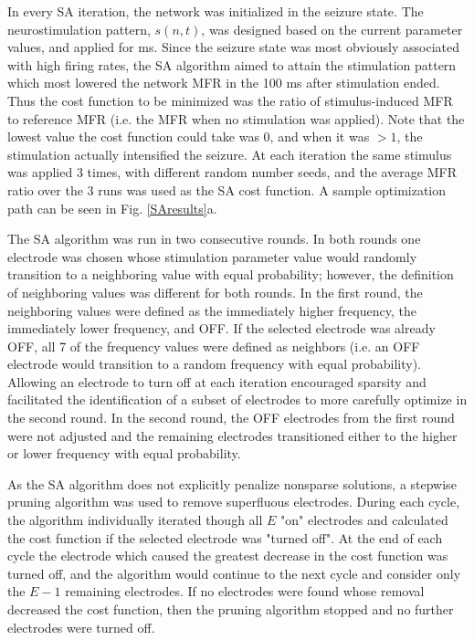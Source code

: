 \documentclass[11pt,a4paper,final]{article}
\begin{document}
In every SA iteration, the network was initialized in the seizure state.
The neurostimulation pattern, $s(n,t)$, was designed based on the current parameter values, and applied for \len ms.
Since the seizure state was most obviously associated with high firing rates, the SA algorithm aimed to attain the stimulation pattern which most lowered the network MFR in the 100 ms after stimulation ended.
Thus the cost function to be minimized was the ratio of stimulus-induced MFR to reference MFR (i.e. the MFR when no stimulation was applied).
Note that the lowest value the cost function could take was 0, and when it was $>1$, the stimulation actually intensified the seizure.
At each iteration the same stimulus was applied 3 times, with different random number seeds, and the average MFR ratio over the 3 runs was used as the SA cost function.
A sample optimization path can be seen in Fig. \ref{SAresults}a.

The SA algorithm was run in two consecutive rounds.
In both rounds one electrode was chosen whose stimulation parameter value would randomly transition to a neighboring value with equal probability; however, the definition of neighboring values was different for both rounds.
In the first round, the neighboring values were defined as the immediately higher frequency, the immediately lower frequency, and OFF.
If the selected electrode was already OFF, all 7 of the frequency values were defined as neighbors (i.e. an OFF electrode would transition to a random frequency with equal probability).
Allowing an electrode to turn off at each iteration encouraged sparsity and facilitated the identification of a subset of electrodes to more carefully optimize in the second round.
In the second round, the OFF electrodes from the first round were not adjusted and the remaining electrodes transitioned either to the higher or lower frequency with equal probability.

As the SA algorithm does not explicitly penalize nonsparse solutions, a stepwise pruning algorithm was used to remove superfluous electrodes.
During each cycle, the algorithm individually iterated though all $E$ "on" electrodes and calculated the cost function if the selected electrode was "turned off".
At the end of each cycle the electrode which caused the greatest decrease in the cost function was turned off, and the algorithm would continue to the next cycle and consider only the $E-1$ remaining electrodes.
If no electrodes were found whose removal decreased the cost function, then the pruning algorithm stopped and no further electrodes were turned off.
\end{document}
